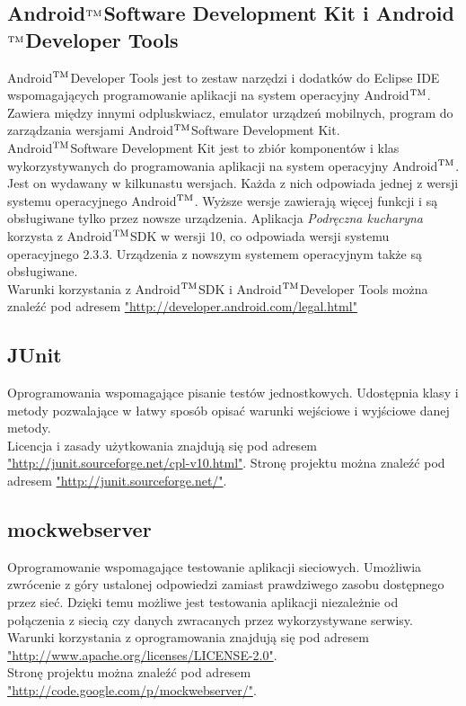 \documentclass[12pt,leqno, twoside]{mwart}
\def\tm{\leavevmode\hbox{$\rm {}^{TM}$}}
\begin{document}
\subsection{Android\tm Software Development Kit i Android\tm Developer Tools}
Android\tm Developer Tools jest to zestaw narzędzi i dodatków do Eclipse IDE wspomagających programowanie aplikacji na system operacyjny Android\tm. Zawiera między innymi odpluskwiacz, emulator urządzeń mobilnych, program do zarządzania wersjami Android\tm Software Development Kit. \\
Android\tm Software Development Kit jest to zbiór komponentów i klas wykorzystywanych do programowania aplikacji na system operacyjny Android\tm. Jest on wydawany w kilkunastu wersjach. Każda z nich odpowiada jednej z wersji systemu operacyjnego Android\tm. Wyższe wersje zawierają więcej funkcji i są obsługiwane tylko przez nowsze urządzenia.
Aplikacja \emph{Podręczna kucharyna} korzysta z Android\tm SDK w wersji 10, co odpowiada wersji systemu operacyjnego 2.3.3. Urządzenia z nowszym systemem operacyjnym także są obsługiwane. \\
Warunki korzystania z Android\tm SDK i Android\tm Developer Tools można znaleźć pod adresem \url{"http://developer.android.com/legal.html"}
\subsection{JUnit}
Oprogramowania wspomagające pisanie testów jednostkowych. Udostępnia klasy i metody pozwalające w łatwy sposób opisać warunki wejściowe i wyjściowe danej metody. \\
Licencja i zasady użytkowania znajdują się pod adresem \url{"http://junit.sourceforge.net/cpl-v10.html"}.
Stronę projektu można znaleźć pod adresem \url{"http://junit.sourceforge.net/"}.
\subsection{mockwebserver}
Oprogramowanie wspomagające testowanie aplikacji sieciowych. Umożliwia zwrócenie z góry ustalonej odpowiedzi zamiast prawdziwego zasobu dostępnego przez sieć. Dzięki temu możliwe jest testowania aplikacji niezależnie od połączenia z siecią czy danych zwracanych przez wykorzystywane serwisy. \\
Warunki korzystania z oprogramowania znajdują się pod adresem \url{"http://www.apache.org/licenses/LICENSE-2.0"}. \\
Stronę projektu można znaleźć pod adresem \url{"http://code.google.com/p/mockwebserver/"}.
\end{document}
